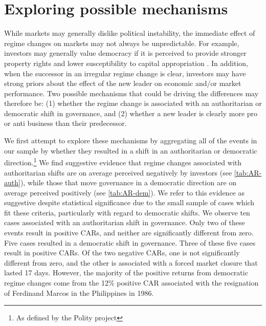 \documentclass[12pt,final,fleqn]{article}
\theoremstyle{plain}
\begin{document}
\section{Exploring possible mechanisms} \label{subsec: mechanisms} 

While markets may generally dislike political instability, the immediate effect of regime changes on markets may not always be unpredictable. For example, investors may generally value democracy if it is perceived to provide stronger property rights and lower susceptibility to capital appropriation \citep{przeworski1982structure, north1989constitutions, svensson1998investment}. In addition, when the successor in an irregular regime change is clear, investors may have strong priors about the effect of the new leader on economic and/or market performance. Two possible mechanisms that could be driving the differences may therefore be: (1) whether the regime change is associated with an authoritarian or democratic shift in governance, and (2) whether a new leader is clearly more pro or anti business than their predecessor. 

We first attempt to explore these mechanisms by aggregating all of the events in our sample by whether they resulted in a shift in an authoritarian or democratic direction.\footnote{As defined by the Polity project} We find suggestive evidence that regime changes associated with authoritarian shifts are on average perceived negatively by investors (see \autoref{tab:AR-auth}), while those that move governance in a democratic direction are on average perceived positively (see \autoref{tab:AR-dem}). We refer to this evidence as suggestive despite statistical significance due to the small sample of cases which fit these criteria, particularly with regard to democratic shifts. We observe ten cases associated with an authoritarian shift in governance. Only two of these events result in positive CARs, and neither are significantly different from zero. Five cases resulted in a democratic shift in governance. Three of these five cases result in positive CARs. Of the two negative CARs, one is not significantly different from zero, and the other is associated with a forced market closure that lasted 17 days. However, the majority of the positive returns from democratic regime changes come from the 12\% positive CAR associated with the resignation of Ferdinand Marcos in the Philippines in 1986. 
\end{document}
